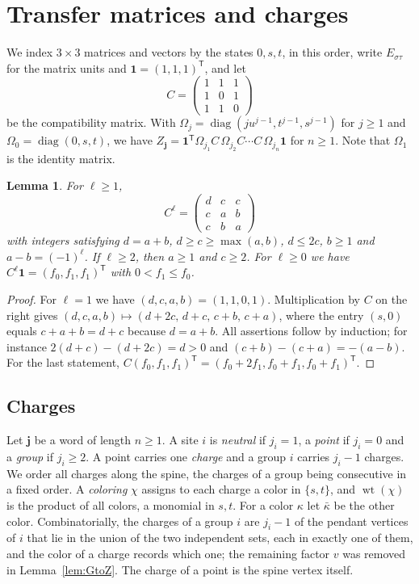 \documentclass{amsart}
\newtheorem{lemma}[theorem]{Lemma}
\theoremstyle{definition}
\theoremstyle{remark}
\numberwithin{equation}{section}
\newcommand{\one}{\mathbf{1}}
\newcommand{\jj}{\mathbf{j}}
\newcommand{\wt}{\operatorname{wt}}
\newcommand{\bs}{\bar{\kappa}}
\begin{document}
\section{Transfer matrices and charges}\label{sec:transfer}

We index $3\times3$ matrices and vectors by the states $0,s,t$, in this order, write $E_{\sigma\tau}$ for the matrix units and $\one=(1,1,1)^{\mathsf T}$, and let
\[
C=\begin{pmatrix}1&1&1\\1&0&1\\1&1&0\end{pmatrix}
\]
be the compatibility matrix. With $\Omega_j=\operatorname{diag}(ju^{j-1},t^{j-1},s^{j-1})$ for $j\ge1$ and $\Omega_0=\operatorname{diag}(0,s,t)$, we have $Z_\jj=\one^{\mathsf T}\Omega_{j_1}C\,\Omega_{j_2}C\cdots C\,\Omega_{j_n}\one$ for $n\ge1$. Note that $\Omega_1$ is the identity matrix.

\begin{lemma}\label{lem:Cpowers}
For $\ell\ge1$,
\[
C^\ell=\begin{pmatrix}d&c&c\\c&a&b\\c&b&a\end{pmatrix}
\]
with integers satisfying $d=a+b$, $d\ge c\ge\max(a,b)$, $d\le2c$, $b\ge1$ and $a-b=(-1)^\ell$. If $\ell\ge2$, then $a\ge1$ and $c\ge2$. For $\ell\ge0$ we have $C^\ell\one=(f_0,f_1,f_1)^{\mathsf T}$ with $0<f_1\le f_0$.
\end{lemma}

\begin{proof}
For $\ell=1$ we have $(d,c,a,b)=(1,1,0,1)$. Multiplication by $C$ on the right gives $(d,c,a,b)\mapsto(d+2c,\,d+c,\,c+b,\,c+a)$, where the entry $(s,0)$ equals $c+a+b=d+c$ because $d=a+b$. All assertions follow by induction; for instance $2(d+c)-(d+2c)=d>0$ and $(c+b)-(c+a)=-(a-b)$. For the last statement, $C(f_0,f_1,f_1)^{\mathsf T}=(f_0+2f_1,f_0+f_1,f_0+f_1)^{\mathsf T}$.
\end{proof}

\subsection{Charges}
Let $\jj$ be a word of length $n\ge1$. A site $i$ is \emph{neutral} if $j_i=1$, a \emph{point} if $j_i=0$ and a \emph{group} if $j_i\ge2$. A point carries one \emph{charge} and a group $i$ carries $j_i-1$ charges. We order all charges along the spine, the charges of a group being consecutive in a fixed order. A \emph{coloring} $\chi$ assigns to each charge a color in $\{s,t\}$, and $\wt(\chi)$ is the product of all colors, a monomial in $s,t$. For a color $\kappa$ let $\bs$ be the other color. Combinatorially, the charges of a group $i$ are $j_i-1$ of the pendant vertices of $i$ that lie in the union of the two independent sets, each in exactly one of them, and the color of a charge records which one; the remaining factor $v$ was removed in Lemma~\ref{lem:GtoZ}. The charge of a point is the spine vertex itself.
\end{document}
